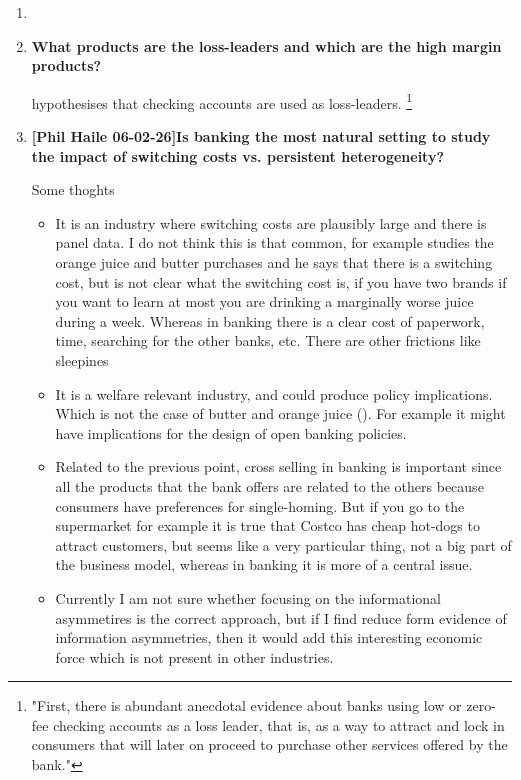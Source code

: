 \documentclass[12pt]{article}
\theoremstyle{plain}
\theoremstyle{plain}
\theoremstyle{definition}  %
\theoremstyle{remark}  %
\begin{document}
\begin{enumerate}
    \item \textbf{}
    
    \item \textbf{What products are the loss-leaders and which are the high margin products?}
    
    \textcite{dick_demand_2008} hypothesises that checking accounts are used as loss-leaders. \footnote{"First, there is abundant anecdotal evidence about banks using low or zero-fee checking accounts as a loss leader, that is, as a way to attract and lock in consumers that will later on proceed to purchase other services offered by the bank." }


    
    \item \textbf{[Phil Haile 06-02-26]Is banking the most natural setting to study the impact of switching costs vs. persistent heterogeneity?}
    

    Some thoghts
    \begin{itemize}
        \item It is an industry where switching costs are plausibly large and there is panel data. I do not think this is that common, for example \textcite{dube_switching_2009} studies the orange juice and butter purchases and he says that there is a switching cost, but is not clear what the switching cost is, if you have two brands if you want to learn at most you are drinking a marginally worse juice during a week. Whereas in banking there is a clear cost of paperwork, time, searching for the other banks, etc. There are other frictions like sleepines \textcite{egan_dynamic_2025} 
        

        \item It is a welfare relevant industry, and could produce policy implications. Which is not the case of butter and orange juice (\cite{dube_switching_2009}). For example it might have implications for the design of open banking policies. 
        \item Related to the previous point, cross selling in banking is important since all the products that the bank offers are related to the others because consumers have preferences for single-homing. But if you go to the supermarket for example it is true that Costco has cheap hot-dogs to attract customers, but seems like a very particular thing, not a  big part of the business model, whereas in banking it is more of a central issue. 
        
        \item Currently I am not sure whether focusing on the informational asymmetires is the correct approach, but if I find reduce form evidence of information asymmetries, then it would add this interesting economic force which is not present in other industries. 
    \end{itemize}



\end{enumerate}
\end{document}
